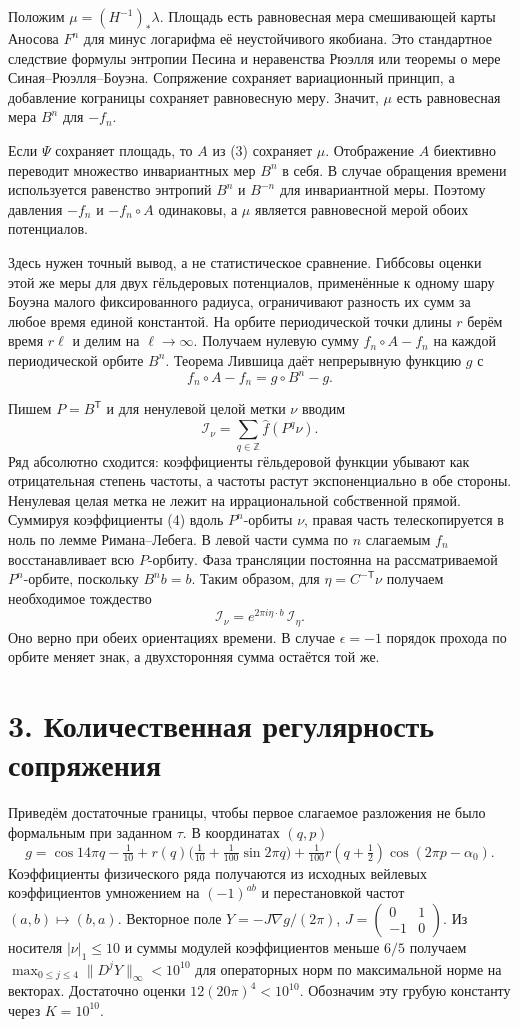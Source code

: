 \documentclass[11pt,a4paper]{article}
\newcommand{\Z}{\mathbb Z}
\newcommand{\sect}[1]{\section*{\sffamily\color{ink}#1}}
\begin{document}
Положим $\mu=(H^{-1})_*\lambda$. Площадь есть равновесная мера смешивающей карты Аносова $F^n$ для минус логарифма её неустойчивого якобиана. Это стандартное следствие формулы энтропии Песина и неравенства Рюэлля или теоремы о мере Синая--Рюэлля--Боуэна. Сопряжение сохраняет вариационный принцип, а добавление кограницы сохраняет равновесную меру. Значит, $\mu$ есть равновесная мера $B^n$ для $-f_n$.

Если $\Psi$ сохраняет площадь, то $A$ из (3) сохраняет $\mu$. Отображение $A$ биективно переводит множество инвариантных мер $B^n$ в себя. В случае обращения времени используется равенство энтропий $B^n$ и $B^{-n}$ для инвариантной меры. Поэтому давления $-f_n$ и $-f_n\circ A$ одинаковы, а $\mu$ является равновесной мерой обоих потенциалов.

Здесь нужен точный вывод, а не статистическое сравнение. Гиббсовы оценки этой же меры для двух гёльдеровых потенциалов, применённые к одному шару Боуэна малого фиксированного радиуса, ограничивают разность их сумм за любое время единой константой. На орбите периодической точки длины $r$ берём время $r\ell$ и делим на $\ell\to\infty$. Получаем нулевую сумму $f_n\circ A-f_n$ на каждой периодической орбите $B^n$. Теорема Лившица даёт непрерывную функцию $g$ с
\[
                         f_n\circ A-f_n=g\circ B^n-g.              \tag{4}
\]

Пишем $P=B^{\mathsf T}$ и для ненулевой целой метки $\nu$ вводим
\[
                  \mathcal I_\nu=\sum_{q\in\Z}\widehat f(P^q\nu).
\]
Ряд абсолютно сходится: коэффициенты гёльдеровой функции убывают как отрицательная степень частоты, а частоты растут экспоненциально в обе стороны. Ненулевая целая метка не лежит на иррациональной собственной прямой. Суммируя коэффициенты (4) вдоль $P^n$-орбиты $\nu$, правая часть телескопируется в ноль по лемме Римана--Лебега. В левой части сумма по $n$ слагаемым $f_n$ восстанавливает всю $P$-орбиту. Фаза трансляции постоянна на рассматриваемой $P^n$-орбите, поскольку $B^n b=b$. Таким образом, для $\eta=C^{-\mathsf T}\nu$ получаем необходимое тождество
\[
                      \boxed{\ \mathcal I_\nu
                      =e^{2\pi i\eta\cdot b}\,\mathcal I_\eta .\ }   \tag{5}
\]
Оно верно при обеих ориентациях времени. В случае $\epsilon=-1$ порядок прохода по орбите меняет знак, а двухсторонняя сумма остаётся той же.
\newpage
\sect{3. Количественная регулярность сопряжения}
Приведём достаточные границы, чтобы первое слагаемое разложения не было формальным при заданном $\tau$. В координатах $(q,p)$
\[
 g=\cos14\pi q-\tfrac1{10}
     +r(q)\bigl(\tfrac1{10}+\tfrac1{100}\sin2\pi q\bigr)
     +\tfrac1{100}r(q+\tfrac12)\cos(2\pi p-\alpha_0).
\]
Коэффициенты физического ряда получаются из исходных вейлевых коэффициентов умножением на $(-1)^{ab}$ и перестановкой частот $(a,b)\mapsto(b,a)$. Векторное поле $Y=-J\nabla g/(2\pi)$, $J=\left(\begin{smallmatrix}0&1\\-1&0\end{smallmatrix}\right)$. Из носителя $|\nu|_1\le10$ и суммы модулей коэффициентов меньше $6/5$ получаем $\max_{0\le j\le4}\|D^jY\|_\infty<10^{10}$ для операторных норм по максимальной норме на векторах. Достаточно оценки $12(20\pi)^4<10^{10}$. Обозначим эту грубую константу через $K=10^{10}$.
\end{document}
